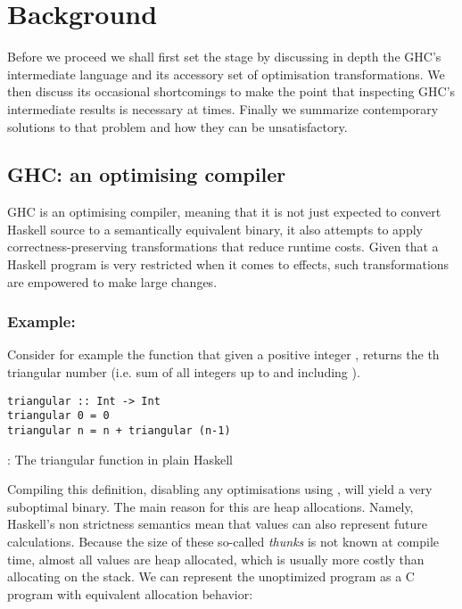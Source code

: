 \chapter{Background}

Before we proceed we shall first set the stage by discussing in depth the GHC's intermediate language and its
accessory set of optimisation transformations. We then discuss its occasional shortcomings to make the point that
inspecting GHC's intermediate results is necessary at times. 
Finally we summarize contemporary solutions to that problem and how they can be unsatisfactory.

\section{GHC: an optimising compiler}

GHC is an optimising compiler, meaning that it is not just expected to convert Haskell source to a semantically equivalent binary,
it also attempts to apply correctness-preserving transformations that reduce runtime costs. Given that a Haskell program is very
restricted when it comes to effects, such transformations are empowered to make large changes.

\subsection{Example: }
Consider for example the function that given a positive integer , returns the th triangular number (i.e. sum of all integers up to and including ).

\begin{listing}[H]
\begin{verbatim}
triangular :: Int -> Int
triangular 0 = 0
triangular n = n + triangular (n-1)
\end{verbatim}
\caption{: The triangular function in plain Haskell}
\end{listing}

Compiling this definition, disabling any optimisations using , will yield a very suboptimal binary. The main
reason for this are heap allocations. Namely, Haskell's non strictness semantics mean that values can also represent
future calculations. Because the size of these so-called \textit{thunks} is not known at compile time, almost all
values are heap allocated, which is usually more costly than allocating on the stack. We can represent the
unoptimized  program as a C program with equivalent allocation behavior:

